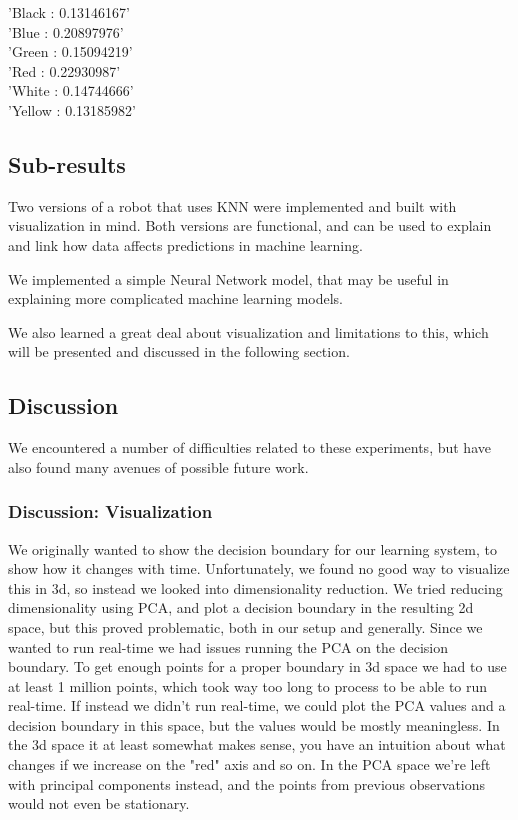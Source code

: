 \documentclass[11pt, a4paper]{article}
\begin{document}
'Black : 0.13146167' \\

'Blue : 0.20897976' \\

'Green : 0.15094219' \\

'Red : 0.22930987' \\

'White : 0.14744666' \\

'Yellow : 0.13185982' 

\subsection{Sub-results}
Two versions of a robot that uses KNN were implemented and built with visualization in mind. Both versions are functional, and can be used to explain and link how data affects predictions in machine learning.

We implemented a simple Neural Network model, that may be useful in explaining more complicated machine learning models.

We also learned a great deal about visualization and limitations to this, which will be presented and discussed in the following section.
\subsection{Discussion}
We encountered a number of difficulties related to these experiments, but have also found many avenues of possible future work.
\subsubsection{Discussion: Visualization}
We originally wanted to show the decision boundary for our learning system, to show how it changes with time. Unfortunately, we found no good way to visualize this in 3d, so instead we looked into dimensionality reduction. We tried reducing dimensionality using PCA, and plot a decision boundary in the resulting 2d space, but this proved problematic, both in our setup and generally. Since we wanted to run real-time we had issues running the PCA on the decision boundary. To get enough points for a proper boundary in 3d space we had to use at least 1 million points, which took way too long to process to be able to run real-time. If instead we didn't run real-time, we could plot the PCA values and a decision boundary in this space, but the values would be mostly meaningless. In the 3d space it at least somewhat makes sense, you have an intuition about what changes if we increase on the "red" axis and so on. In the PCA space we're left with principal components instead, and the points from previous observations would not even be stationary.
\end{document}
